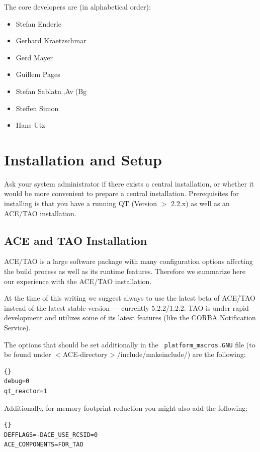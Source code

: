 \documentclass[10pt]{book}
\begin{document}
The \miro core developers are (in alphabetical order):
\begin{itemize}
  \item Stefan Enderle
  \item Gerhard Kraetzschmar
  \item Gerd Mayer
  \item Guillem Pages
  \item Stefan Sablatn,Av(Bg
  \item Steffen Simon
  \item Hans Utz
\end{itemize}

\section{Installation and Setup}

Ask your system administrator if there exists a central installation,
or whether it would be more convenient to prepare a central
installation. Prerequisites for installing \miro is that you have a
running QT (Version $>$ 2.2.x) as well as an ACE/TAO installation.

\subsection{ACE and TAO Installation}
\label{sec::ace-install}

ACE/TAO is a large software package with many configuration
options affecting the build process as well as its runtime
features. Therefore we summarize here our experience with the
ACE/TAO installation.

At the time of this writing we suggest always to use the
latest beta of ACE/TAO instead of the latest stable version ---
currently 5.2.2/1.2.2. TAO is under rapid development and \miro
utilizes some of its latest features (like the CORBA Notification
Service).

The options that should be set additionally in the {\tt
  platform\_macros.GNU} file (to be found under
$<$ACE-directory$>$/include/makeinclude/) are the following:

\begin{lstlisting}[frame=tb]{}
debug=0
qt_reactor=1
\end{lstlisting}

Additionally, for memory footprint reduction you might also add the
following:

\begin{lstlisting}[frame=tb]{}
DEFFLAGS=-DACE_USE_RCSID=0
ACE_COMPONENTS=FOR_TAO
\end{lstlisting}
\end{document}
